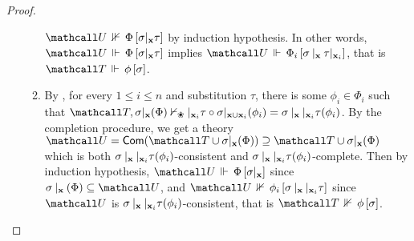 \begin{proof}
\begin{itemize}
\begin{enumerate}
      $\neforces{\tU}{\Phi}{\restr{\sigma}{\bx}\tau}$ by induction
      hypothesis. In other words,
      $\eforces{\tU}{\Phi}{\restr{\sigma}{\bx}\tau}$ implies
      $\eforces{\tU}{\Phi_i}{\update{\update{\sigma}{\bx}{\tau}}{\bx_i}{}}$,
      that is $\eforces{\tT}{\phi}{\sigma}$.
      \item By , for every $1 \leq i \leq n$ and
      substitution $\tau$, there is some $\phi_i \in \Phi_i$ such that $\tT,
      \restr{\sigma}{\bx}(\Phi) \nvdash_\Nature
      \update{}{\bx_i}{\tau} \circ \restr{\sigma}{\bx \cup
      \bx_i}(\phi_i) =
      \update{\update{\sigma}{\bx}{}}{\bx_i}{\tau}(\phi_i)$. By
      the completion procedure, we get a theory $\tU = \completion{\tT \cup
      \restr{\sigma}{\bx}(\Phi)} \supseteq \tT \cup
      \restr{\sigma}{\bx}(\Phi)$ which is both
      $\sigma \mathbin{|_{\mathbf{x}}} \mathbin{|_{\mathbf{x}_i}} \tau(\phi_i)$-consistent
      and
      $\sigma \mathbin{|_{\mathbf{x}}} \mathbin{|_{\mathbf{x}_i}} \tau(\phi_i)$-complete.
      Then by induction hypothesis,
      $\eforces{\tU}{\Phi}{\update{\sigma}{\bx}{}}$ since
      $\update{\sigma}{\bx}{}(\Phi) \subseteq \tU$, and
      $\neforces{\tU}{\phi_i}{\update{\update{\sigma}{\bx}{}}{\bx_i}{\tau}}$
      since $\tU$ is
      $\sigma \mathbin{|_{\mathbf{x}}} \mathbin{|_{\mathbf{x}_i}} \tau(\phi_i)$-consistent,
      that is $\neforces{\tT}{\phi}{\sigma}$.
    \end{enumerate}
  \end{itemize}
\end{proof}

